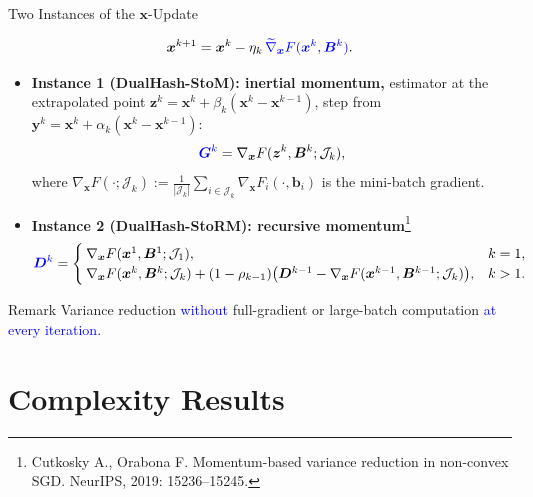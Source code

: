 \documentclass[mathserif,compress,override,9pt]{beamer}
\numberwithin{equation}{section}
\newcommand{\nii}{\noindent}
\newcommand{\bx}{\bm{x}}
\newcommand{\bb}{\bm{b}}
\newcommand{\by}{\bm{y}}
\newcommand{\bz}{\bm{z}}
\newcommand{\bD}{\bm{D}}
\newcommand{\bB}{\bm{B}}
\newcommand{\bG}{\bm{G}}
\newcommand{\calJ}{\mathcal{J}}
\newcommand{\blue}[1]{\textcolor{blue}{#1}}
\theoremstyle{remark}
\begin{document}
\begin{frame}{Two Instances of the $\bx$-Update}
\vspace{0.1cm}

\[
\bx^{k+1} = \bx^k - \eta_k\, \blue{\widetilde\nabla_{\bx} F(\bx^k,\bB^k)}.
\]

\begin{itemize}
\item[\blue{$\triangleright$}] \textbf{Instance 1 (DualHash-StoM): inertial momentum,}
estimator at the extrapolated point $\bz^k=\bx^k+\beta_k(\bx^k-\bx^{k-1})$, step from $\by^k=\bx^k+\alpha_k(\bx^k-\bx^{k-1})$:
\[
\blue{\bG^k} = \nabla_{\bx} F(\bz^k,\bB^k;\calJ_k),
\] where $\nabla_{\bx}F(\cdot;\calJ_k):=\frac{1}{|\calJ_k|}\sum_{i\in\calJ_k}\nabla_{\bx}F_i(\cdot,\bb_i)$ is the mini-batch gradient.

\item[\blue{$\triangleright$}] \textbf{Instance 2 (DualHash-StoRM): recursive momentum}\footnote{Cutkosky A., Orabona F. Momentum-based variance reduction in non-convex SGD. NeurIPS, 2019: 15236--15245.}
{\small
\[
\blue{\bD^k} =
\begin{cases}
\nabla_{\bx} F(\bx^1,\bB^1;\calJ_1), & k=1,\\
\nabla_{\bx} F(\bx^k,\bB^k;\calJ_k) + (1-\rho_{k-1})\bigl(\bD^{k-1}-\nabla_{\bx} F(\bx^{k-1},\bB^{k-1};\calJ_k)\bigr), & k>1.
\end{cases}
\]
}
\end{itemize}

\vspace{0.1cm}
\begin{block}{Remark}
Variance reduction \blue{without} full-gradient or large-batch computation \blue{at every iteration}.
\end{block}
\end{frame}

\section{Complexity Results}
\end{document}
